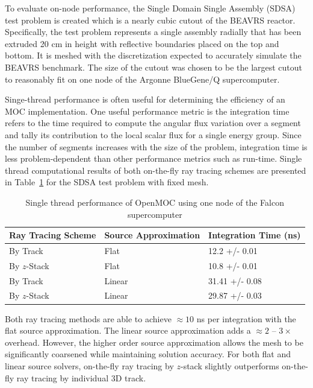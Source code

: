 \documentclass[12pt,twoside]{mitthesis-exec}
\begin{document}
To evaluate on-node performance, the Single Domain Single Assembly (SDSA) test problem is created which is a nearly cubic cutout of the BEAVRS reactor. Specifically, the test problem represents a single assembly radially that has been extruded 20 cm in height with reflective boundaries placed on the top and bottom. It is meshed with the discretization expected to accurately simulate the BEAVRS benchmark. The size of the cutout was chosen to be the largest cutout to reasonably fit on one node of the Argonne BlueGene/Q supercomputer.

Singe-thread performance is often useful for determining the efficiency of an MOC implementation. One useful performance metric is the integration time refers to the time required to compute the angular flux variation over a segment and tally its contribution to the local scalar flux for a single energy group. Since the number of segments increases with the size of the problem, integration time is less problem-dependent than other performance metrics such as run-time. Single thread computational results of both on-the-fly ray tracing schemes are presented in Table~\ref{tab:rt-single-thread} for the SDSA test problem with fixed mesh.

\begin{table}[ht]
	\centering
	\caption{Single thread performance of OpenMOC using one node of the Falcon supercomputer}
	\medskip
	\begin{tabular}{l|l|l}
		\hline
		Ray Tracing Scheme & Source Approximation & Integration Time (ns) \\
		\hline
		By Track  & Flat & 12.2 +/- 0.01 \\
		By $z$-Stack & Flat & 10.8 +/- 0.01 \\
		\hline
		By Track  & Linear & 31.41 +/- 0.08 \\
		By $z$-Stack & Linear & 29.87 +/- 0.03 \\
		\hline
	\end{tabular}
	\label{tab:rt-single-thread}
\end{table}

Both ray tracing methods are able to achieve $\approx 10$ ns per integration with the flat source approximation. The linear source approximation adds a $\approx 2 $ -- $3 \times$ overhead. However, the higher order source approximation allows the mesh to be significantly coarsened while maintaining solution accuracy. For both flat and linear source solvers, on-the-fly ray tracing by $z$-stack slightly outperforms on-the-fly ray tracing by individual 3D track. 
\end{document}
